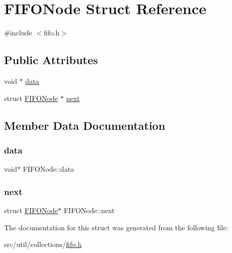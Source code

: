 \hypertarget{structFIFONode}{}\section{F\+I\+F\+O\+Node Struct Reference}
\label{structFIFONode}


{\ttfamily \#include $<$fifo.\+h$>$}

\subsection*{Public Attributes}
\begin{DoxyCompactItemize}
\item 
void $\ast$ \hyperlink{structFIFONode_a1e34000f616caca5906a4a2593af6255}{data}
\item 
struct \hyperlink{structFIFONode}{F\+I\+F\+O\+Node} $\ast$ \hyperlink{structFIFONode_afb58133f3b26141c6ff0489bf5a0f2af}{next}
\end{DoxyCompactItemize}


\subsection{Member Data Documentation}
\hypertarget{structFIFONode_a1e34000f616caca5906a4a2593af6255}{}\label{structFIFONode_a1e34000f616caca5906a4a2593af6255} 
\subsubsection{\texorpdfstring{data}{data}}
{\footnotesize\ttfamily void$\ast$ F\+I\+F\+O\+Node\+::data}

\hypertarget{structFIFONode_afb58133f3b26141c6ff0489bf5a0f2af}{}\label{structFIFONode_afb58133f3b26141c6ff0489bf5a0f2af} 
\subsubsection{\texorpdfstring{next}{next}}
{\footnotesize\ttfamily struct \hyperlink{structFIFONode}{F\+I\+F\+O\+Node}$\ast$ F\+I\+F\+O\+Node\+::next}



The documentation for this struct was generated from the following file\+:\begin{DoxyCompactItemize}
\item 
src/util/collections/\hyperlink{fifo_8h}{fifo.\+h}\end{DoxyCompactItemize}
